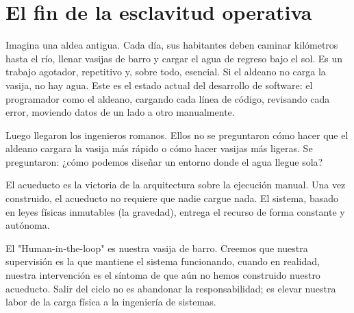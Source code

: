 \chapter{El fin de la esclavitud operativa}

Imagina una aldea antigua. Cada día, sus habitantes deben caminar kilómetros hasta el río, llenar vasijas de barro y cargar el agua de regreso bajo el sol. Es un trabajo agotador, repetitivo y, sobre todo, esencial. Si el aldeano no carga la vasija, no hay agua. Este es el estado actual del desarrollo de software: el programador como el aldeano, cargando cada línea de código, revisando cada error, moviendo datos de un lado a otro manualmente.

Luego llegaron los ingenieros romanos. Ellos no se preguntaron cómo hacer que el aldeano cargara la vasija más rápido o cómo hacer vasijas más ligeras. Se preguntaron: ¿cómo podemos diseñar un entorno donde el agua llegue sola?

El acueducto es la victoria de la arquitectura sobre la ejecución manual. Una vez construido, el acueducto no requiere que nadie cargue nada. El sistema, basado en leyes físicas inmutables (la gravedad), entrega el recurso de forma constante y autónoma. 

El "Human-in-the-loop" es nuestra vasija de barro. Creemos que nuestra supervisión es la que mantiene el sistema funcionando, cuando en realidad, nuestra intervención es el síntoma de que aún no hemos construido nuestro acueducto. Salir del ciclo no es abandonar la responsabilidad; es elevar nuestra labor de la carga física a la ingeniería de sistemas.